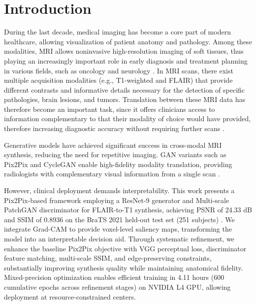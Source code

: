 \documentclass[runningheads]{llncs}
\begin{document}
\section{Introduction}

During the last decade, medical imaging has become a core part of modern healthcare, allowing visualization of patient anatomy and pathology. Among these modalities, MRI allows noninvasive high-resolution imaging of soft tissues, thus playing an increasingly important role in early diagnosis and treatment planning in various fields, such as oncology and neurology \cite{Berghout2024}. In MRI scans, there exist multiple acquisition modalities (e.g., T1-weighted and FLAIR) that provide different contrasts and informative details necessary for the detection of specific pathologies, brain lesions, and tumors. Translation between these MRI data has therefore become an important task, since it offers clinicians access to information complementary to that their modality of choice would have provided, therefore increasing diagnostic accuracy without requiring further scans \cite{Ibrahim2024}.

Generative models have achieved significant success in cross-modal MRI synthesis, reducing the need for repetitive imaging. GAN variants such as Pix2Pix and CycleGAN enable high-fidelity modality translation, providing radiologists with complementary visual information from a single scan \cite{Khalil2024}.

However, clinical deployment demands interpretability. This work presents a Pix2Pix-based framework \cite{Isola2017} employing a ResNet-9 generator and Multi-scale PatchGAN discriminator for FLAIR-to-T1 synthesis, achieving PSNR of 24.33 dB and SSIM of 0.8936 on the BraTS 2021 held-out test set (251 subjects) \cite{dataset}. We integrate Grad-CAM \cite{Selvaraju2017,Bhati2024} to provide voxel-level saliency maps, transforming the model into an interpretable decision aid. Through systematic refinement, we enhance the baseline Pix2Pix objective with VGG perceptual loss, discriminator feature matching, multi-scale SSIM, and edge-preserving constraints, substantially improving synthesis quality while maintaining anatomical fidelity. Mixed-precision optimization enables efficient training in 4.11 hours (600 cumulative epochs across refinement stages) on NVIDIA L4 GPU, allowing deployment at resource-constrained centers.
\end{document}
